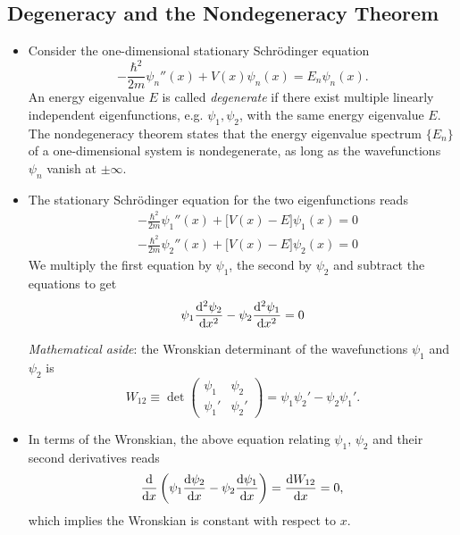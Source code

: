 \documentclass[11pt, a4paper]{article}
\newcommand{\Schro}{Schr\"{o}dinger\xspace}
\newcommand{\p}{\psi}  %
\begin{document}
\subsection{Degeneracy and the Nondegeneracy Theorem}
\begin{itemize}
	\item Consider the one-dimensional stationary \Schro equation 
	\begin{equation*}
		-\frac{\hbar^{2}}{2m}\psi_{n}''(x) + V(x)\p_{n}(x) = E_{n}\p_{n}(x).
	\end{equation*}
	An energy eigenvalue $ E $ is called \textit{degenerate} if there exist multiple linearly independent eigenfunctions, e.g. $ \psi_{1}, \psi_{2} $, with the same energy eigenvalue $ E $. The nondegeneracy theorem states that the energy eigenvalue spectrum $ \{E_{n}\} $ of a one-dimensional system is nondegenerate, as long as the wavefunctions $ \psi_{n} $ vanish at $ \pm \infty $.
	
	\item The stationary \Schro equation for the two eigenfunctions reads
	\begin{align*}
		& -\frac{\hbar^{2}}{2m}\psi_{1}''(x) + \big[V(x) - E\big]\p_{1}(x) = 0\\
		& -\frac{\hbar^{2}}{2m}\psi_{2}''(x) + \big[V(x) - E\big]\p_{2}(x) = 0
	\end{align*}
	We multiply the first equation by $ \p_{1} $, the second by $ \p_{2} $ and subtract the equations to get
	\begin{equation*}
		\p_{1}\dv[2]{\p_{2}}{x} - \p_{2}\dv[2]{\p_{1}}{x} = 0
	\end{equation*}
	
	\textit{Mathematical aside}: the Wronskian determinant of the wavefunctions $ \p_{1} $ and $ \p_{2} $ is
	\begin{equation*}
		W_{12} \equiv \det 
		\begin{pmatrix}
			\p_{1} & \p_{2}\\
			\p_{1}' & \p_{2}'
		\end{pmatrix}
		= \p_{1}\p_{2}' - \p_{2}\p_{1}'.
	\end{equation*}
	
	\item In terms of the Wronskian, the above equation relating $ \p_{1} $, $ \p_{2} $ and their second derivatives reads
	\begin{equation*}
		\dv{x}\left(\p_{1}\dv{\p_{2}}{x} - \p_{2}\dv{\p_{1}}{x}\right) = \dv{W_{12}}{x} = 0,
	\end{equation*}
	which implies the Wronskian is constant with respect to $ x $. 
	

\end{itemize}
\end{document}
